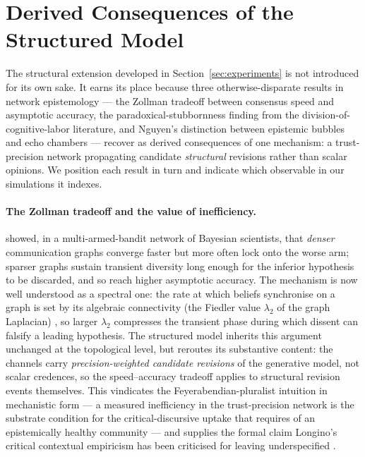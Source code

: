 \section{Derived Consequences of the Structured Model}
\label{sec:derived-results}

The structural extension developed in Section~\ref{sec:experiments} is
not introduced for its own sake. It earns its place because three
otherwise-disparate results in network epistemology --- the Zollman
tradeoff between consensus speed and asymptotic accuracy, the
paradoxical-stubbornness finding from the division-of-cognitive-labor
literature, and Nguyen's distinction between epistemic bubbles and
echo chambers --- recover as derived consequences of one mechanism: a
trust-precision network propagating candidate \emph{structural}
revisions rather than scalar opinions. We position each result in turn
and indicate which observable in our simulations it indexes.

\paragraph{The Zollman tradeoff and the value of inefficiency.}
\citet{zollman2007NetworkEpistemology, zollman2010TransientDiversity}
showed, in a multi-armed-bandit network of Bayesian scientists, that
\emph{denser} communication graphs converge faster but more often
lock onto the worse arm; sparser graphs sustain transient diversity
long enough for the inferior hypothesis to be discarded, and so reach
higher asymptotic accuracy. The mechanism is now well understood as a
spectral one: the rate at which beliefs synchronise on a graph is set
by its algebraic connectivity (the Fiedler value $\lambda_2$ of the
graph Laplacian)
\citep{Griparic2021_7, Montijano2017_11, Tan2008_14}, so larger
$\lambda_2$ compresses the transient phase during which dissent can
falsify a leading hypothesis. The structured model inherits this
argument unchanged at the topological level, but reroutes its
substantive content: the channels carry \emph{precision-weighted
candidate revisions} of the generative model, not scalar credences,
so the speed–accuracy tradeoff applies to structural revision events
themselves. This vindicates the Feyerabendian-pluralist intuition
\citep{Müürsepp2019_7} in mechanistic form --- a measured inefficiency
in the trust-precision network is the substrate condition for the
critical-discursive uptake that
\citet{longino1990ScienceSocialKnowledge} requires of an epistemically
healthy community --- and supplies the formal claim Longino's
critical contextual empiricism has been criticised for leaving
underspecified \citep{Novaes2025_1, Ajdari2023_6, Borgerson2011_5}.

